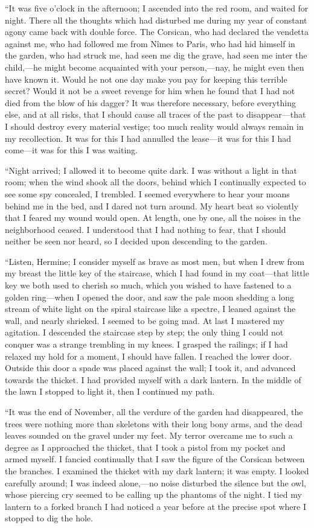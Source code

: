 “It was five o’clock in the afternoon; I ascended into the red room,
and waited for night. There all the thoughts which had disturbed me
during my year of constant agony came back with double force. The
Corsican, who had declared the vendetta against me, who had followed me
from Nîmes to Paris, who had hid himself in the garden, who had struck
me, had seen me dig the grave, had seen me inter the child,—he might
become acquainted with your person,—nay, he might even then have known
it. Would he not one day make you pay for keeping this terrible secret?
Would it not be a sweet revenge for him when he found that I had not
died from the blow of his dagger? It was therefore necessary, before
everything else, and at all risks, that I should cause all traces of
the past to disappear—that I should destroy every material vestige; too
much reality would always remain in my recollection. It was for this I
had annulled the lease—it was for this I had come—it was for this I was
waiting.

“Night arrived; I allowed it to become quite dark. I was without a
light in that room; when the wind shook all the doors, behind which I
continually expected to see some spy concealed, I trembled. I seemed
everywhere to hear your moans behind me in the bed, and I dared not
turn around. My heart beat so violently that I feared my wound would
open. At length, one by one, all the noises in the neighborhood ceased.
I understood that I had nothing to fear, that I should neither be seen
nor heard, so I decided upon descending to the garden.

“Listen, Hermine; I consider myself as brave as most men, but when I
drew from my breast the little key of the staircase, which I had found
in my coat—that little key we both used to cherish so much, which you
wished to have fastened to a golden ring—when I opened the door, and
saw the pale moon shedding a long stream of white light on the spiral
staircase like a spectre, I leaned against the wall, and nearly
shrieked. I seemed to be going mad. At last I mastered my agitation. I
descended the staircase step by step; the only thing I could not
conquer was a strange trembling in my knees. I grasped the railings; if
I had relaxed my hold for a moment, I should have fallen. I reached the
lower door. Outside this door a spade was placed against the wall; I
took it, and advanced towards the thicket. I had provided myself with a
dark lantern. In the middle of the lawn I stopped to light it, then I
continued my path.

“It was the end of November, all the verdure of the garden had
disappeared, the trees were nothing more than skeletons with their long
bony arms, and the dead leaves sounded on the gravel under my feet. My
terror overcame me to such a degree as I approached the thicket, that I
took a pistol from my pocket and armed myself. I fancied continually
that I saw the figure of the Corsican between the branches. I examined
the thicket with my dark lantern; it was empty. I looked carefully
around; I was indeed alone,—no noise disturbed the silence but the owl,
whose piercing cry seemed to be calling up the phantoms of the night. I
tied my lantern to a forked branch I had noticed a year before at the
precise spot where I stopped to dig the hole.

